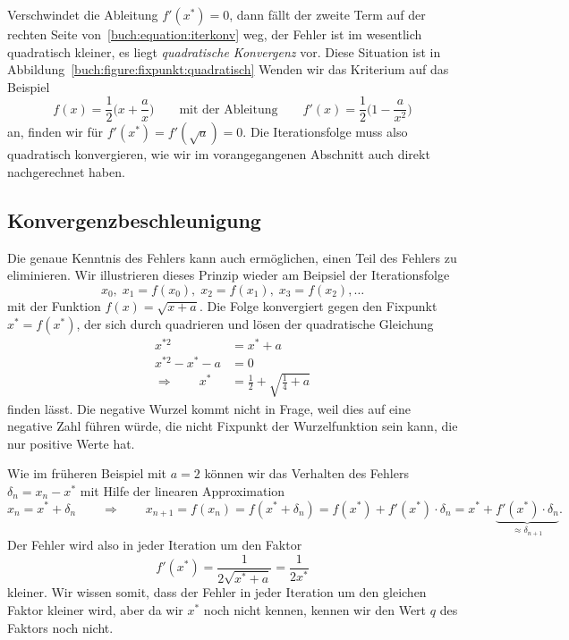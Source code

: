 Verschwindet die Ableitung $f'(x^*)=0$, dann fällt der zweite Term
auf der rechten Seite von~\eqref{buch:equation:iterkonv} weg, der
Fehler ist im wesentlich quadratisch kleiner, es liegt {\em quadratische
Konvergenz} vor.
%
%
Diese Situation ist in Abbildung~\ref{buch:figure:fixpunkt:quadratisch}
Wenden wir das Kriterium auf das Beispiel 
\[
f(x) = \frac12\biggl( x + \frac{a}{x}\biggr)
\qquad\text{mit der Ableitung}\qquad
f'(x) = \frac12\biggl( 1 -\frac{a}{x^2}\biggr)
\]
an, finden wir für $f'(x^*)=f'(\sqrt{a}) = 0$.
Die Iterationsfolge muss also quadratisch konvergieren, wie wir
im vorangegangenen Abschnitt auch direkt nachgerechnet haben.

%
%
\subsection{Konvergenzbeschleunigung
\label{buch:subsection:konvergenzbeschleunigung}}
Die genaue Kenntnis des Fehlers kann auch ermöglichen, einen Teil
des Fehlers zu eliminieren.
Wir illustrieren dieses Prinzip wieder am Beipsiel der Iterationsfolge
\[
x_0,\; x_1=f(x_0),\; x_2=f(x_1),\;x_3=f(x_2),\dots
\]
mit der Funktion $f(x)=\sqrt{x+a}$.
Die Folge konvergiert gegen den Fixpunkt $x^* = f(x^*)$, der
sich durch quadrieren und lösen der quadratische
Gleichung
\begin{align*}
x^{*2} &= x^*+a\\
x^{*2} - x^*-a&=0\\
\Rightarrow\qquad
x^* &= \frac12 +\sqrt{\frac14+a}
\end{align*}
finden lässt.
Die negative Wurzel kommt nicht in Frage, weil dies auf eine negative Zahl
führen würde, die nicht Fixpunkt der Wurzelfunktion sein kann, die nur
positive Werte hat.

Wie im früheren Beispiel mit $a=2$ können wir das Verhalten des Fehlers
$\delta_n = x_n-x^*$
mit Hilfe der linearen Approximation
\[
x_n = x^* + \delta_n
\qquad\Rightarrow\qquad
x_{n+1} = f(x_n) = f(x^* + \delta_n) = f(x^*) + f'(x^*)\cdot \delta_n
=
x^* + \underbrace{f'(x^*)\cdot \delta_n}_{\displaystyle\approx\delta_{n+1}}.
\]
Der Fehler wird also in jeder Iteration um den Faktor
\[
f'(x^*) = \frac1{2\sqrt{x^*+a}}=\frac1{2x^*}
\]
kleiner.
Wir wissen somit, dass der Fehler in jeder Iteration um den gleichen Faktor
kleiner wird, aber da wir $x^*$ noch nicht kennen, kennen wir den Wert $q$
des Faktors noch nicht.

